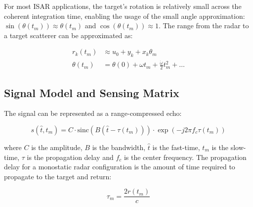 \documentclass[journal]{IEEEtran}
\begin{document}
\noindent For most ISAR applications, the target's rotation is relatively small across the coherent integration time, enabling the usage of the small angle approximation: $\sin(\theta(t_{m})) \approx\theta(t_{m})$ and $\cos(\theta(t_m)) \approx 1$. The range from the radar to a target scatterer can be approximated as:

\begin{equation}
  \begin{aligned}
    r_{k}(t_{m}) &\approx u_{0} + y_{k} + x_{k}\theta_{m} \\ \theta(t_{m}) &= \theta(0) + \omega t_{m} + \frac{\dot{\omega}}{2}t_{m}^{2} + \dots
  \end{aligned}
  \label{eq:r_final}
\end{equation}

\subsection{Signal Model and Sensing Matrix} \label{sec:signal} 

 The signal can be represented as a range-compressed echo:

\begin{equation}
    s(\hat{t},t_{m}) = C \cdot \text{sinc}(B(\hat{t} - \tau(t_{m})))\cdot \exp(-j2 \pi f_{c} \tau(t_{m}))
\end{equation}

\noindent where $C$ is the amplitude, $B$ is the bandwidth, $\hat{t}$ is the fast-time, $t_{m}$ is the slow-time, $\tau$ is the propagation delay and $f_{c}$ is the center frequency. The propagation delay for a monostatic radar configuration is the amount of time required to propagate to the target and return:

\begin{equation}
    \tau_{m} = \frac{2r(t_{m})}{c}
\end{equation}
\end{document}

